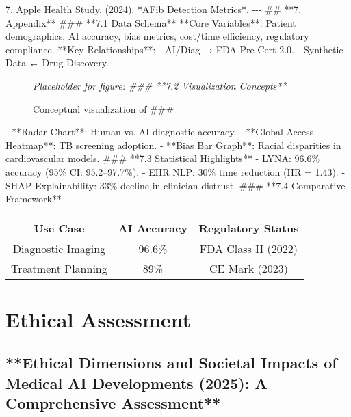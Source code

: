 \documentclass{article}%
\begin{document}
%
7. Apple Health Study. (2024). *AFib Detection Metrics*.\newline%
%
{-}{-}{-}\newline%
%
\#\# **7. Appendix**\newline%
%
\#\#\# **7.1 Data Schema**\newline%
%
**Core Variables**: Patient demographics, AI accuracy, bias metrics, cost/time efficiency, regulatory compliance.\newline%
%
**Key Relationships**:\newline%
%
{-} AI/Diag → FDA Pre{-}Cert 2.0.\newline%
%
{-} Synthetic Data ↔ Drug Discovery.\newline%
%


\begin{figure}[h]%
\centering%
\textit{Placeholder for figure: ### **7.2 Visualization Concepts**}%
\caption{Conceptual visualization of \#\#\#}%
\end{figure}

%
{-} **Radar Chart**: Human vs. AI diagnostic accuracy.\newline%
%
{-} **Global Access Heatmap**: TB screening adoption.\newline%
%
{-} **Bias Bar Graph**: Racial disparities in cardiovascular models.\newline%
%
\#\#\# **7.3 Statistical Highlights**\newline%
%
{-} LYNA: 96.6\% accuracy (95\% CI: 95.2–97.7\%).\newline%
%
{-} EHR NLP: 30\% time reduction (HR = 1.43).\newline%
%
{-} SHAP Explainability: 33\% decline in clinician distrust.\newline%
%
\#\#\# **7.4 Comparative Framework**\newline%
%
\begin{tabular}{|ccc|}%
\hline%
Use Case&AI Accuracy&Regulatory Status\\%
\hline%
Diagnostic Imaging&96.6\%&FDA Class II (2022)\\%
Treatment Planning&89\%&CE Mark (2023)\\%
\hline%
\end{tabular}

%
\section{Ethical Assessment}%
\label{sec:EthicalAssessment}%
\subsection{**Ethical Dimensions and Societal Impacts of Medical AI Developments (2025): A Comprehensive Assessment**}%
\label{subsec:**EthicalDimensionsandSocietalImpactsofMedicalAIDevelopments(2025)AComprehensiveAssessment**}%
\end{document}
